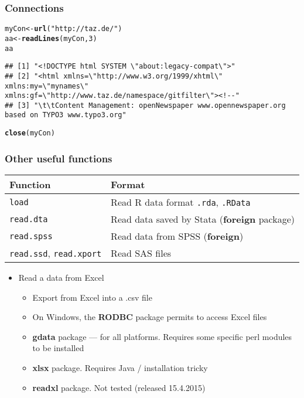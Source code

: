 \documentclass[paper=screen,mathserif]{beamer}\usepackage[]{graphicx}\usepackage[]{color}
\makeatletter
\newcommand{\hlnum}[1]{\textcolor[rgb]{0.686,0.059,0.569}{#1}}%
\newcommand{\hlstr}[1]{\textcolor[rgb]{0.192,0.494,0.8}{#1}}%
\newcommand{\hlstd}[1]{\textcolor[rgb]{0.345,0.345,0.345}{#1}}%
\newcommand{\hlkwb}[1]{\textcolor[rgb]{0.69,0.353,0.396}{#1}}%
\newcommand{\hlkwd}[1]{\textcolor[rgb]{0.737,0.353,0.396}{\textbf{#1}}}%
\newenvironment{kframe}{%
 \def\at@end@of@kframe{}%
 \ifinner\ifhmode%
  \def\at@end@of@kframe{\end{minipage}}%
  \begin{minipage}{\columnwidth}%
 \fi\fi%
 \def\FrameCommand##1{\hskip\@totalleftmargin \hskip-\fboxsep
 \colorbox{shadecolor}{##1}\hskip-\fboxsep
     \hskip-\linewidth \hskip-\@totalleftmargin \hskip\columnwidth}%
 \MakeFramed {\advance\hsize-\width
   \@totalleftmargin\z@ \linewidth\hsize
   \@setminipage}}%
 {\par\unskip\endMakeFramed%
 \at@end@of@kframe}
\newenvironment{knitrout}{}{} %
\newcommand{\ft}[1]{\frametitle{#1}}
\makeatother
\begin{document}
\begin{frame}[fragile]
  \ft{Connections}

\begin{knitrout}\scriptsize
{}\color{fgcolor}\begin{kframe}
\begin{alltt}
\hlstd{myCon} \hlkwb{<-} \hlkwd{url}\hlstd{(}\hlstr{"http://taz.de/"}\hlstd{)}
\hlstd{aa} \hlkwb{<-} \hlkwd{readLines}\hlstd{(myCon,} \hlnum{3}\hlstd{)}
\hlstd{aa}
\end{alltt}
\begin{verbatim}
## [1] "<!DOCTYPE html SYSTEM \"about:legacy-compat\">"                                                                           
## [2] "<html xmlns=\"http://www.w3.org/1999/xhtml\" xmlns:my=\"mynames\" xmlns:gf=\"http://www.taz.de/namespace/gitfilter\"><!--"
## [3] "\t\tContent Management: openNewspaper www.opennewspaper.org based on TYPO3 www.typo3.org"
\end{verbatim}
\begin{alltt}
\hlkwd{close}\hlstd{(myCon)}
\end{alltt}
\end{kframe}
\end{knitrout}
\end{frame}

\begin{frame}[fragile]
  \ft{Other useful functions}
  \begin{center}
    \begin{tabular}{lp{6cm}}
      \toprule
      Function & Format \\
      \midrule
      \verb=load= & Read R data format {\tt .rda}, {\tt .RData} \\
      \verb=read.dta= & Read data saved by Stata ({\bf foreign} package)\\
      \verb=read.spss= & Read data from SPSS ({\bf foreign})\\
      \verb=read.ssd=, \verb=read.xport= & Read SAS files \\
      \bottomrule
    \end{tabular}
  \end{center}
  \begin{itemize}
  \item Read a data from Excel
    \begin{itemize}
    \item \alert{Export from Excel into a .csv file}
    \item On Windows, the {\bf RODBC} package permits to access Excel files
    \item {\bf gdata} package --- for all platforms. Requires some specific
      perl modules to be installed
    \item {\bf xlsx} package. Requires Java / installation tricky
    \item {\bf readxl} package. Not tested (released 15.4.2015)
    \end{itemize}
  \end{itemize}
\end{frame}
\end{document}
